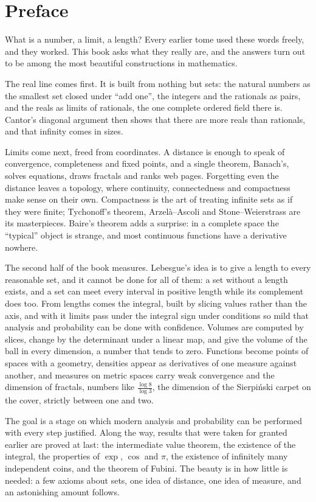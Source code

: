 \chapter*{Preface}
What is a number, a limit, a length? Every earlier tome used these words freely, and they worked. This book asks
what they really are, and the answers turn out to be among the most beautiful constructions in mathematics.

The real line comes first. It is built from nothing but sets: the natural numbers as the smallest set closed under
``add one'', the integers and the rationals as pairs, and the reals as limits of rationals, the one complete
ordered field there is. Cantor's diagonal argument then shows that there are more reals than rationals, and that
infinity comes in sizes.

Limits come next, freed from coordinates. A distance is enough to speak of convergence, completeness and fixed
points, and a single theorem, Banach's, solves equations, draws fractals and ranks web pages. Forgetting even the
distance leaves a topology, where continuity, connectedness and compactness make sense on their own. Compactness is
the art of treating infinite sets as if they were finite; Tychonoff's theorem, Arzel\`a--Ascoli and
Stone--Weierstrass are its masterpieces. Baire's theorem adds a surprise: in a complete space the ``typical'' object
is strange, and most continuous functions have a derivative nowhere.

The second half of the book measures. Lebesgue's idea is to give a length to every reasonable set, and it cannot be
done for all of them: a set without a length exists, and a set can meet every interval in positive length while its complement does too.
From lengths comes the integral, built by slicing values rather than the axis, and with it limits pass under the
integral sign under conditions so mild that analysis and probability can be done with confidence. Volumes are
computed by slices, change by the determinant under a linear map, and give the volume of the ball in every
dimension, a number that tends to zero. Functions become points of spaces with a geometry, densities appear as
derivatives of one measure against another, and measures on metric spaces carry weak convergence and the dimension
of fractals, numbers like $\frac{\log8}{\log3}$, the dimension of the Sierpi\'nski carpet on the cover, strictly between one and two.

The goal is a stage on which modern analysis and probability can be performed with every step justified. Along the
way, results that were taken for granted earlier are proved at last: the intermediate value theorem, the existence of
the integral, the properties of $\exp$, $\cos$ and $\pi$, the existence of infinitely many independent coins, and
the theorem of Fubini. The beauty is in how little is needed: a few axioms about sets, one idea of distance, one idea
of measure, and an astonishing amount follows.

